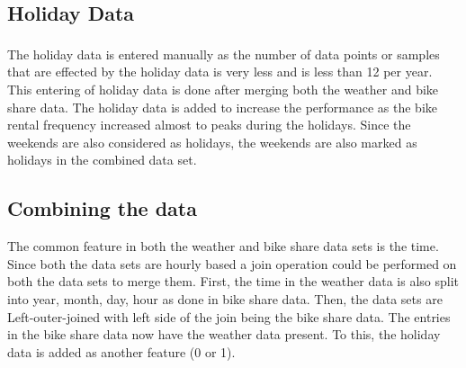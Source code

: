 \documentclass[journal, a4paper]{IEEEtran}
\begin{document}
\subsection{Holiday Data}
The holiday data\textsuperscript{\cite{holidaydata}} is entered manually as the number of data points or samples that are effected by the holiday data is very less and is less than 12 per year. This entering of holiday data is done after merging both the weather and bike share data. The holiday data is added to increase the performance as the bike rental frequency increased almost to peaks during the holidays. Since the weekends are also considered as holidays, the weekends are also marked as holidays in the combined data set. 

\subsection{Combining the data}
The common feature in both the weather and bike share data sets is the time. Since both the data sets are hourly based a join operation could be performed on both the data sets to merge them. First, the time in the weather data is also split into year, month, day, hour as done in bike share data. Then, the data sets are Left-outer-joined 
with left side of the join being the bike share data. The entries in the bike share data now have the weather data present. To this, the holiday data is added as another feature (0 or 1).
\end{document}
